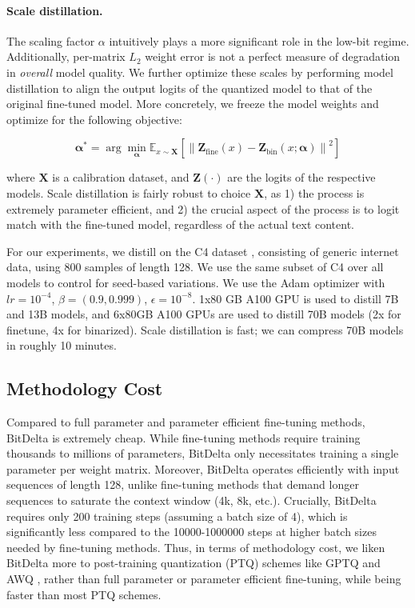 \documentclass[numbers]{article}
\newcommand{\oursmethod}{BitDelta\xspace}
\begin{document}
\paragraph{Scale distillation. } The scaling factor $\alpha$ intuitively plays a more significant role in the low-bit regime. Additionally, per-matrix $L_2$ weight error is not a perfect measure of degradation in \emph{overall} model quality. We further optimize these scales by performing model distillation to align the output logits of the quantized model to that of the original fine-tuned model. More concretely, we freeze the model weights and optimize for the following objective:

\begin{equation}
    \boldsymbol{\alpha}^* = \arg\min_{\boldsymbol{\alpha}} \mathbb{E}_{x \sim \mathbf{X}}\left[ \left\| \mathbf{Z}_{\text{fine}}(x) - \mathbf{Z}_{\text{bin}}(x; \boldsymbol{\alpha}) \right\|^2 \right]
\end{equation}

where $\mathbf{X}$ is a calibration dataset, and $\mathbf{Z}(\cdot)$ are the logits of the respective models. Scale distillation is fairly robust to choice $\mathbf{X}$, as 1) the process is extremely parameter efficient, and 2) the crucial aspect of the process is to logit match with the fine-tuned model, regardless of the actual text content.

For our experiments, we distill on the C4 dataset \citep{raffel2023exploring}, consisting of generic internet data, using 800 samples of length 128. We use the same subset of C4 over all models to control for seed-based variations. We use the Adam optimizer \cite{kingma2017adam} with $lr=10^{-4}$, $\beta = (0.9,0.999)$, $\epsilon=10^{-8}$. 1x80 GB A100 GPU is used to distill 7B and 13B models, and 6x80GB A100 GPUs are used to distill 70B models (2x for finetune, 4x for binarized). Scale distillation is fast; we can compress 70B models in roughly 10 minutes.




\subsection{Methodology Cost}
Compared to full parameter and parameter efficient fine-tuning methods, \oursmethod is extremely cheap. While fine-tuning methods require training thousands to millions of parameters, \oursmethod only necessitates training a single parameter per weight matrix. Moreover, \oursmethod operates efficiently with input sequences of length 128, unlike fine-tuning methods that demand longer sequences to saturate the context window (4k, 8k, etc.). Crucially, \oursmethod requires only 200 training steps (assuming a batch size of 4), which is significantly less compared to the 10000-1000000 steps at higher batch sizes needed by fine-tuning methods. Thus, in terms of methodology cost, we liken \oursmethod more to post-training quantization (PTQ) schemes like GPTQ \cite{frantar2022gptq} and AWQ \cite{lin2023awq}, rather than full parameter or parameter efficient fine-tuning, while being faster than most PTQ schemes.
\end{document}
